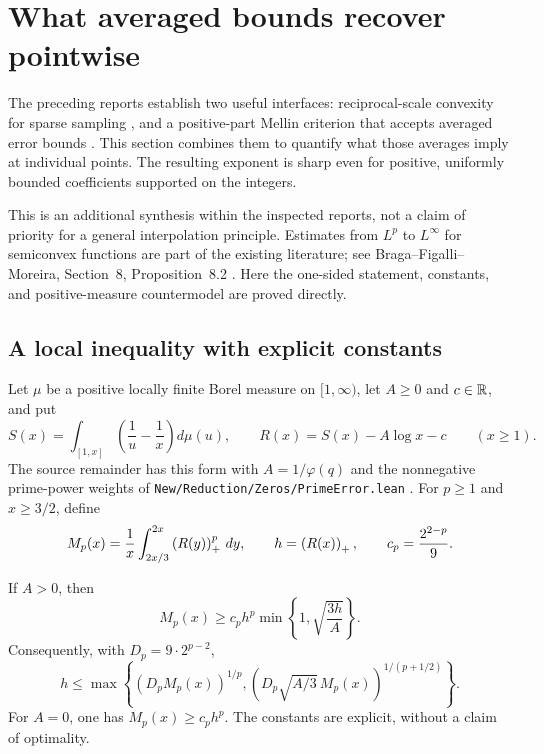 \section{What averaged bounds recover pointwise}
\label{sec:mean-pointwise}

The preceding reports establish two useful interfaces: reciprocal-scale
convexity for sparse sampling \cite{priorSampling}, and a positive-part
Mellin criterion that accepts averaged error bounds \cite{priorMean}.
This section combines them to quantify what those averages imply at
individual points. The resulting exponent is sharp even for positive,
uniformly bounded coefficients supported on the integers.

This is an additional synthesis within the inspected reports, not a claim
of priority for a general interpolation principle. Estimates from
$L^p$ to $L^\infty$ for semiconvex functions are part of the existing
literature; see Braga--Figalli--Moreira, Section~8, Proposition~8.2
\cite{BFM}. Here the one-sided statement, constants, and positive-measure
countermodel are proved directly.

\subsection{A local inequality with explicit constants}

Let $\mu$ be a positive locally finite Borel measure on $[1,\infty)$,
let $A\ge0$ and $c\in\mathbb R$, and put
\begin{equation}\label{eq:mpt-ramp}
 S(x)=\int_{[1,x]}\left(\frac1u-\frac1x\right)d\mu(u),
 \qquad R(x)=S(x)-A\log x-c \qquad (x\ge1).
\end{equation}
The source remainder has this form with $A=1/\varphi(q)$ and the
nonnegative prime-power weights of
\texttt{New/Reduction/Zeros/PrimeError.lean} \cite{source}.
For $p\ge1$ and $x\ge3/2$, define
\[
 M_p(x)=\frac1x\int_{2x/3}^{2x}\left(R(y)\right)_{+}^p\,dy,
 \qquad h=\left(R(x)\right)_{+},\qquad c_p=\frac{2^{2-p}}9.
\]

\begin{theorem}
\label{thm:mpt-local}
If $A>0$, then
\begin{equation}\label{eq:mpt-mass}
 M_p(x)\ge c_p h^p\min\left\{1,\sqrt{\frac{3h}{A}}\right\}.
\end{equation}
Consequently, with $D_p=9\cdot2^{p-2}$,
\begin{equation}\label{eq:mpt-point}
 h\le\max\left\{(D_pM_p(x))^{1/p},
 \left(D_p\sqrt{A/3}\,M_p(x)\right)^{1/(p+1/2)}\right\}.
\end{equation}
For $A=0$, one has $M_p(x)\ge c_p h^p$.
The constants are explicit, without a claim of optimality.
\end{theorem}

